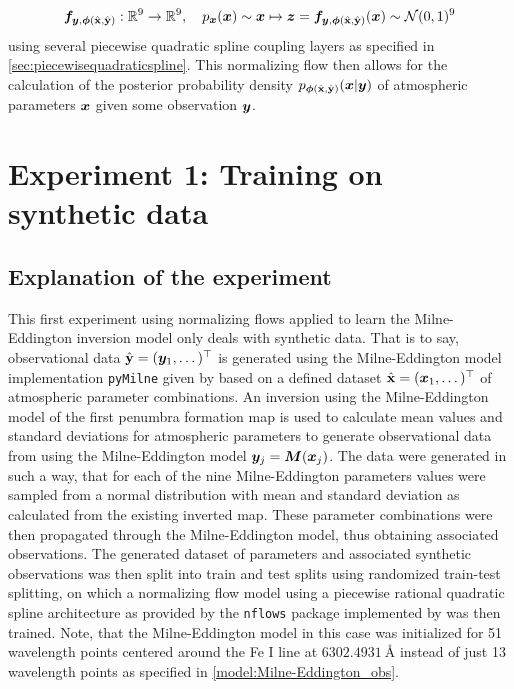 \documentclass[a4paper,12pt]{report}
\begin{document}
\begin{align}\begin{aligned}
\bm{f}_{\bm{y},\bm{\phi}(\hat{\boldsymbol{\mathbf{x}}},\hat{\boldsymbol{\mathbf{y}}})}: \mathbb{R}^{9} \rightarrow \mathbb{R}^{9}, \quad p_{\bm{x}}(\bm{x}) \sim \bm{x} \mapsto \bm{z} = \bm{f}_{\bm{y},\bm{\phi}(\hat{\boldsymbol{\mathbf{x}}},\hat{\boldsymbol{\mathbf{y}}})}(\bm{x}) \sim  \mathcal{N}(0,1)^{9}
\end{aligned}\end{align} using several piecewise quadratic spline coupling layers as specified in \cref{sec:piecewisequadraticspline}. This normalizing flow then allows for the calculation of the posterior probability density $p_{\bm{\phi}(\hat{\boldsymbol{\mathbf{x}}},\hat{\boldsymbol{\mathbf{y}}})}(\bm{x}|\bm{y})$ of atmospheric parameters $\bm{x}$ given some observation $\bm{y}$.

\section{Experiment 1: Training on synthetic data}
\subsection{Explanation of the experiment}
This first experiment using normalizing flows applied to learn the Milne-Eddington inversion model only deals with synthetic data. That is to say, observational data $\hat{\boldsymbol{\mathbf{y}}} = (\bm{y}_1,\dots)^\top$ is generated using the Milne-Eddington model implementation \verb|pyMilne| given by \cite{LaCruzRodriguez.2019} based on a defined dataset $\hat{\boldsymbol{\mathbf{x}}} = (\bm{x}_1,\dots)^\top$ of atmospheric parameter combinations. An inversion using the Milne-Eddington model of the first penumbra formation map is used to calculate mean values and standard deviations for atmospheric parameters to generate observational data from using the Milne-Eddington model $\bm{y}_j = \bm{M}(\bm{x}_j)$. The data were generated in such a way, that for each of the nine Milne-Eddington parameters values were sampled from a normal distribution with mean and standard deviation as calculated from the existing inverted map. These parameter combinations were then propagated through the Milne-Eddington model, thus obtaining associated observations. The generated dataset of parameters and associated synthetic observations was then split into train and test splits using randomized train-test splitting, on which a normalizing flow model using a piecewise rational quadratic spline architecture as provided by the \verb|nflows| package implemented by \cite{Durkan.10.06.2019} was then trained. Note, that the Milne-Eddington model in this case was initialized for 51 wavelength points centered around the Fe I line at $\SI{6302.4931}{\angstrom}$ instead of just 13 wavelength points as specified in \cref{model:Milne-Eddington_obs}.
\end{document}
